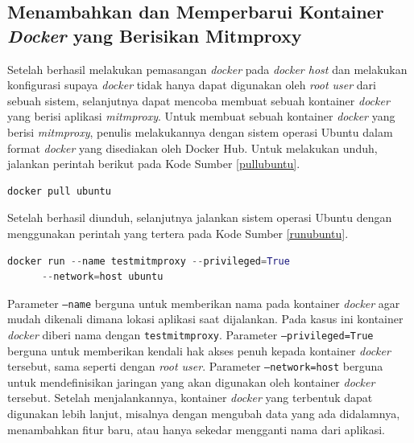   \subsection{Menambahkan dan Memperbarui Kontainer \textit{Docker} yang Berisikan Mitmproxy}
  Setelah berhasil melakukan pemasangan \textit{docker} pada \textit{docker host} dan melakukan konfigurasi supaya \textit{docker} tidak hanya dapat digunakan oleh \textit{root user} dari sebuah sistem, selanjutnya dapat mencoba membuat sebuah kontainer \textit{docker} yang berisi aplikasi \textit{mitmproxy}. Untuk membuat sebuah kontainer \textit{docker} yang berisi \textit{mitmproxy}, penulis melakukannya dengan sistem operasi Ubuntu dalam format \textit{docker} yang disediakan oleh Docker Hub. Untuk melakukan unduh, jalankan perintah berikut pada Kode Sumber \ref{pullubuntu}.
  \newline
  \begin{minipage}{\linewidth}
  \begin{lstlisting}[caption=Perintah untuk \textit{Pull} Ubuntu,language=Python,label=pullubuntu]
  docker pull ubuntu
  \end{lstlisting}
  \end{minipage}
  Setelah berhasil diunduh, selanjutnya jalankan sistem operasi Ubuntu dengan menggunakan perintah yang tertera pada Kode Sumber \ref{runubuntu}.
  \newline
  \begin{minipage}{\linewidth}
  \begin{lstlisting}[caption=Perintah untuk Menjalankan \textit{Image} Ubuntu,language=Python,label=runubuntu]
  docker run --name testmitmproxy --privileged=True 
 	  --network=host ubuntu
  \end{lstlisting}
  \end{minipage}
	Parameter \texttt{--name} berguna untuk memberikan nama pada kontainer \textit{docker} agar mudah dikenali dimana lokasi aplikasi saat dijalankan. Pada kasus ini kontainer \textit{docker} diberi nama dengan \texttt{testmitmproxy}. Parameter \texttt{--privileged=True} berguna untuk memberikan kendali hak akses penuh kepada kontainer \textit{docker} tersebut, sama seperti dengan \textit{root user}. Parameter \texttt{--network=host} berguna untuk mendefinisikan jaringan yang akan digunakan oleh kontainer \textit{docker} tersebut. Setelah menjalankannya, kontainer \textit{docker} yang terbentuk dapat digunakan lebih lanjut, misalnya dengan mengubah data yang ada didalamnya, menambahkan fitur baru, atau hanya sekedar mengganti nama dari aplikasi.\\
